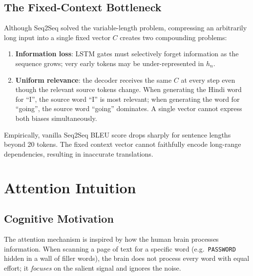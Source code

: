 \documentclass[12pt,a4paper]{article}
\begin{document}
\subsection{The Fixed-Context Bottleneck}

Although Seq2Seq solved the variable-length problem, compressing an
arbitrarily long input into a single fixed vector $C$ creates two
compounding problems:

\begin{enumerate}[label=(\alph*)]
  \item \textbf{Information loss}: LSTM gates must selectively forget
        information as the sequence grows; very early tokens may be
        under-represented in $h_n$.
  \item \textbf{Uniform relevance}: the decoder receives the same
        $C$ at every step even though the relevant source tokens
        change.  When generating the Hindi word for ``I'', the source
        word ``I'' is most relevant; when generating the word for
        ``going'', the source word ``going'' dominates.  A single
        vector cannot express both biases simultaneously.
\end{enumerate}

\begin{warningbox}
  Empirically, vanilla Seq2Seq BLEU score drops sharply for sentence
  lengths beyond 20 tokens.  The fixed context vector cannot
  faithfully encode long-range dependencies, resulting in inaccurate
  translations.
\end{warningbox}

\section{Attention Intuition}
\label{sec:intuition}

\subsection{Cognitive Motivation}

The attention mechanism is inspired by how the human brain processes
information.  When scanning a page of text for a specific word (e.g.\
\texttt{PASSWORD} hidden in a wall of filler words), the brain does
not process every word with equal effort; it \emph{focuses} on the
salient signal and ignores the noise.
\end{document}
